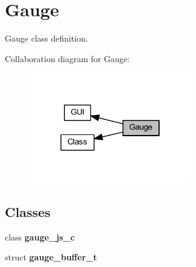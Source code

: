 \section{Gauge}
\label{group___gauge}


Gauge class definition.  


Collaboration diagram for Gauge\+:
\nopagebreak
\begin{figure}[H]
\begin{center}
\leavevmode
\includegraphics[width=202pt]{group___gauge}
\end{center}
\end{figure}
\subsection*{Classes}
\begin{DoxyCompactItemize}
\item 
class \textbf{ gauge\+\_\+js\+\_\+c}
\item 
struct \textbf{ gauge\+\_\+buffer\+\_\+t}
\end{DoxyCompactItemize}
